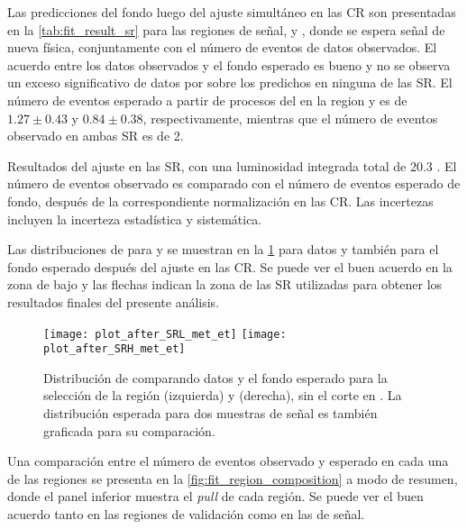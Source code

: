 Las predicciones del fondo luego del ajuste simultáneo en las CR son presentadas
en la \cref{tab:fit_result_sr} para las regiones de señal, {\SRL} y {\SRH}, donde
se espera señal de nueva física,
conjuntamente con el número de eventos de datos observados. El acuerdo entre los
datos observados y el fondo esperado es bueno y no se observa un exceso
significativo de datos por sobre los predichos en ninguna de las SR.
El número de eventos esperado a partir de procesos del {\SM}  en la region {\SRL} y
{\SRH} es de $1.27\pm0.43$ y $0.84\pm0.38$, respectivamente, mientras que el
número de eventos observado en ambas SR es de 2.

\begin{table}[!htbp]
  \centering

  \caption{Resultados del ajuste en las SR, con una luminosidad integrada total
    de 20.3 \ifb. El número de eventos observado es comparado con el número de
    eventos esperado de fondo, después de la correspondiente normalización en
    las CR. Las incertezas incluyen la incerteza estadística y sistemática.}
  \label{tab:fit_result_sr}

  

\end{table}


Las distribuciones de {\met} para {\SRL} y {\SRH} se muestran en la
\cref{fig:met_sr} para datos y también para el fondo esperado después del
ajuste en las CR. Se puede ver el buen acuerdo en la zona de bajo {\met} y las
flechas indican la zona de las SR utilizadas para obtener los resultados finales
del presente análisis.

\begin{figure}[!htbp]

  \centering

  \texttt{[image: plot\_after\_SRL\_met\_et]}
  \texttt{[image: plot\_after\_SRH\_met\_et]}

  \caption{Distribución de {\met} comparando datos y el fondo esperado para la
    selección de la región {\SRL} (izquierda) y {\SRH} (derecha), sin el corte
    en {\met}. La distribución esperada para dos muestras de señal es también
    graficada para su comparación.}
  \label{fig:met_sr}

\end{figure}

Una comparación entre el número de eventos observado y esperado en cada una de las
regiones se presenta en la \cref{fig:fit_region_composition} a modo de resumen, donde
el panel inferior muestra el \emph{pull} de cada región. Se puede ver el buen acuerdo
tanto en las regiones de validación como en las de señal.


